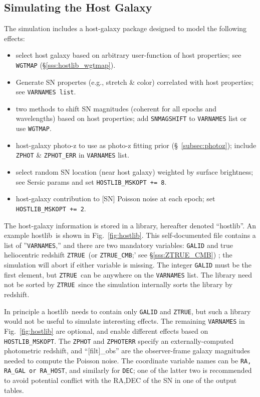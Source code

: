 \documentclass[12pt]{article}
\newcommand{\hostlib}{{\sc hostlib}}
\newcommand{\ztrue}{{\tt ZTRUE}}
\begin{document}
{%
\clearpage
\subsection{Simulating the Host Galaxy}
\label{subsec:hostlib}

The simulation includes a host-galaxy
package designed to model the following effects:
\begin{itemize}
%
  \item select host galaxy based on arbitrary user-function
        of host properties; see {\tt WGTMAP} (\S\ref{sss:hostlib_wgtmap}).
%
  \item Generate SN propertes (e.g., stretch \& color) correlated
        with host properties; see {\tt VARNAMES list}.
%
  \item two methods to shift SN magnitudes 
        (coherent for all epochs and wavelengths) 
        based on host properties;
	add {\tt SNMAGSHIFT} to  {\tt VARNAMES} list or use {\tt WGTMAP}.
%
  \item host-galaxy photo-z to use as photo-z fitting prior 
    (\S~\ref{subsec:photoz});
    include {\tt ZPHOT} \& {\tt ZPHOT\_ERR} in {\tt VARNAMES} list.	
%
  \item select random SN location (near host galaxy)
    weighted by surface brightness; see Sersic params
    and set {\tt HOSTLIB\_MSKOPT += 8}.
%
  \item host-galaxy contribution to [SN] Poisson noise at each epoch;
    set {\tt HOSTLIB\_MSKOPT += 2}.
%
\end{itemize} 

The host-galaxy information is stored in a library,
hereafter denoted ``{\hostlib}''. An example \hostlib\
is shown in Fig.~\ref{fig:hostlib}.
This self-documented file contains a list of ''{\tt VARNAMES},''  
and there are two mandatory variables: {\tt GALID} and 
true heliocentric redshift \ztrue\ 
(or {\tt ZTRUE\_CMB};' see \S\ref{sss:ZTRUE_CMB}) ; 
the simulation will abort if either variable is missing. 
The integer {\tt GALID} must be the first element,
but \ztrue\ can be anywhere on the {\tt VARNAMES} list.
The library need not be sorted by \ztrue\ since
the simulation internally sorts the library by redshift.

In principle a \hostlib\ needs to contain only
{\tt GALID} and \ztrue, but such a library would
not be useful to simulate interesting effects.
The remaining {\tt VARNAMES} in Fig.~\ref{fig:hostlib}
are optional, and enable different effects based on {\tt HOSTLIB\_MSKOPT}.
The {\tt ZPHOT} and {\tt ZPHOTERR} specify 
an externally-computed photometric redshift, 
and ``[filt]\_obs'' are the observer-frame galaxy
magnitudes needed to compute the Poisson noise.
The coordinate variable names can be {\tt RA, RA\_GAL or RA\_HOST},
and similarly for {\tt DEC}; one of the latter two is recommended
to avoid potential conflict with the RA,DEC of the SN in one of the
output tables.

}
\end{document}
